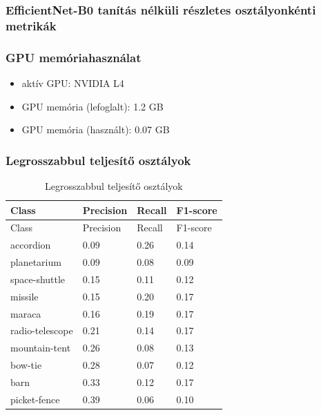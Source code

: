 \subsubsection{EfficientNet-B0 tanítás nélküli részletes osztályonkénti metrikák}
  

\subsubsection{GPU memóriahasználat}
\begin{itemize}
  \item aktív GPU: NVIDIA L4
  \item GPU memória (lefoglalt): 1.2 GB
  \item GPU memória (használt):  0.07 GB
\end{itemize}

\subsubsection{Legrosszabbul teljesítő osztályok}
\begin{center}
  \begin{longtable}{llll}
  \caption{Legrosszabbul teljesítő osztályok}\label{tab:phase01_EfficientNet-B0_legrosszabb_osztlyok}\\
  \toprule
  Class & Precision & Recall & F1-score \\
  \midrule
  \endfirsthead
  \toprule
  Class & Precision & Recall & F1-score \\
  \midrule
  \endhead
  accordion & 0.09 & 0.26 & 0.14 \\
  planetarium & 0.09 & 0.08 & 0.09 \\
  space-shuttle & 0.15 & 0.11 & 0.12 \\
  missile & 0.15 & 0.20 & 0.17 \\
  maraca & 0.16 & 0.19 & 0.17 \\
  radio-telescope & 0.21 & 0.14 & 0.17 \\
  mountain-tent & 0.26 & 0.08 & 0.13 \\
  bow-tie & 0.28 & 0.07 & 0.12 \\
  barn & 0.33 & 0.12 & 0.17 \\
  picket-fence & 0.39 & 0.06 & 0.10 \\
  \bottomrule
  \end{longtable}
  \end{center}  